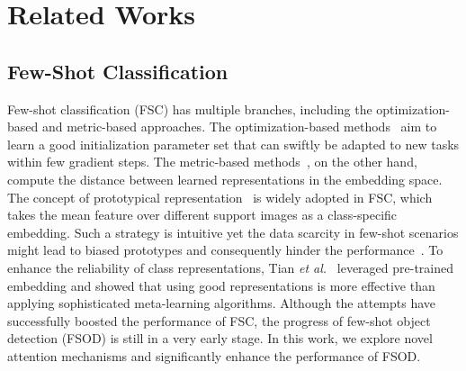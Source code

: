 \documentclass[journal]{IEEEtran}
\newcommand{\etal}{\textit{et al.}}
\begin{document}
\section{Related Works}

\subsection{Few-Shot Classification}
Few-shot classification (FSC) has multiple branches, including the optimization-based and metric-based approaches.
The optimization-based methods~\cite{ravi2016optimization, finn2017model, li2017meta, nichol2018first, lee2019meta} aim to learn a good initialization parameter set that can swiftly be adapted to new tasks within few gradient steps. 
The metric-based methods~\cite{koch2015siamese, vinyals2016matching, snell2017prototypical, sung2018learning, liu2019prototype, tian2020rethinking}, on the other hand, compute the distance between learned representations in the embedding space.
The concept of prototypical representation~\cite{snell2017prototypical} is widely adopted in FSC, which takes the mean feature over different support images as a class-specific embedding.
Such a strategy is intuitive yet the data scarcity in few-shot scenarios might lead to biased prototypes and consequently hinder the performance~\cite{liu2019prototype}.
To enhance the reliability of class representations, Tian \etal~\cite{tian2020rethinking} leveraged pre-trained embedding and showed that using good representations is more effective than applying sophisticated meta-learning algorithms.
Although the attempts have successfully boosted the performance of FSC, the progress of few-shot object detection (FSOD) is still in a very early stage.
In this work, we explore novel attention mechanisms and significantly enhance the performance of FSOD.
\end{document}
